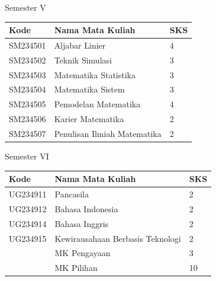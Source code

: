 \documentclass[aspectratio=169]{beamer} %
\begin{document}

\begin{frame}{Semester V}

\begin{table}
	\renewcommand{\arraystretch}{1.3}
	\setlength{\tabcolsep}{10pt}
	\begin{tabular}{l l l}
		\toprule
		\textbf{Kode} & \textbf{Nama Mata Kuliah} & \textbf{SKS} \\
		\midrule
		SM234501 & Aljabar Linier & 4 \\
		SM234502 & Teknik Simulasi & 3 \\
		SM234503 & Matematika Statistika & 3 \\
		SM234504 & Matematika Sistem & 3 \\
		SM234505 & Pemodelan Matematika & 4 \\
		SM234506 & Karier Matematika & 2 \\
		SM234507 & Penulisan Ilmiah Matematika & 2 \\
		\bottomrule
	\end{tabular}
\end{table}

\end{frame}


\begin{frame}{Semester VI}

\begin{table}
	\renewcommand{\arraystretch}{1.3}
	\setlength{\tabcolsep}{10pt}
	\begin{tabular}{l l l}
		\toprule
		\textbf{Kode} & \textbf{Nama Mata Kuliah} & \textbf{SKS} \\
		\midrule
		UG234911 & Pancasila & 2 \\
		UG234912 & Bahasa Indonesia & 2 \\
		UG234914 & Bahasa Inggris & 2 \\
		UG234915 & Kewirausahaan Berbasis Teknologi & 2 \\
		& MK Pengayaan & 3 \\
		& MK Pilihan & 10 \\
		\bottomrule
	\end{tabular}
\end{table}

\end{frame}
\end{document}
